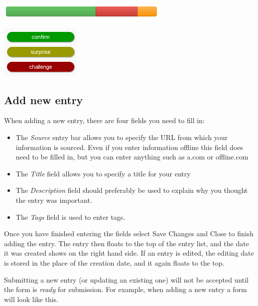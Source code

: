 \documentclass[letterpaper,10pt,english]{sphinxmanual}
\begin{document}
{\hfill\includegraphics{candy-basket-supertags-count.png}\hfill}

{\hfill\includegraphics{candy-basket-supertags.png}\hfill}


\subsection{Add new entry}
\label{user-guide:add-new-entry}
When adding a new entry, there are four fields you need to fill in:
\begin{itemize}
\item {} 
The \emph{Source} entry bar allows you to specify the URL from which your information is sourced. Even if you enter information offline this field does need to be filled in, but you can enter anything such as a.com or offline.com

\item {} 
The \emph{Title} field allows you to specify a title for your entry

\item {} 
The \emph{Description} field should preferably be used to explain why you thought the entry was important.

\item {} 
The \emph{Tags} field is used to enter tags.

\end{itemize}

Once you have finished entering the fields select Save Changes and
Close to finish adding the entry. The entry then floats to the top of
the entry list, and the date it was created shows on the right hand
side.  If an entry is edited, the editing date is stored in the place
of the creation date, and it again floats to the top.

Submitting a new entry (or updating an existing one) will not be
accepted until the form is \emph{ready} for submission. For example, when
adding a new entry a form will look like this.
\end{document}
